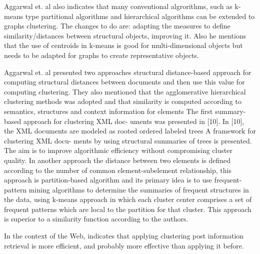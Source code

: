 \documentclass[runningheads]{llncs}
\begin{document}
Aggarwal et. al \cite{Aggarwal} also indicates that many conventional algrorithms, such as k-means type partitional algorithms and hierarchical algorithms can be extended to graphs clustering. The changes to do are: adapting the measures to define similarity/distances between structural objects, improving it. Also he mentions that the use of centroids in k-means is good for multi-dimensional objects but needs to be adapted for graphs to create representative objects. 

Aggarwal et. al \cite{Aggarwal} presented two approaches structural distance-based approach for computing structural distances between documents and then use this value for computing clustering. They also mentioned that the agglomerative hierarchical clustering methods was adopted and that similarity is computed according to semantics, structures and context information for elements The first summary-based approach for clustering XML doc- uments was presented in [10]. In [10], the XML documents are modeled as rooted ordered labeled trees  A framework for clustering XML docu- ments by using structural summaries of trees is presented. The aim is to improve algorithmic efficiency without compromising cluster quality.  In another approach the distance between two elements is defined according to the number of common element-subelement relationship, this approach is partition-based algorithm and its primary idea is to use frequent-pattern mining algorithms to determine the summaries of frequent structures in the data, using k-means approach in which each cluster center comprises a set of frequent patterns which are local to the partition for that cluster. This approach is superior to a similarity function according to the authors.

In the context of the Web, \cite{Carpineto} indicates that applying clustering post information retrieval is more efficient, and probably more effective than applying it before.
\end{document}
